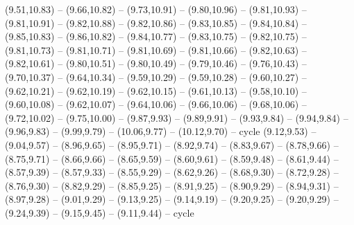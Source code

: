{(9.51,10.83) -- (9.66,10.82) -- (9.73,10.91) -- (9.80,10.96) -- (9.81,10.93) -- (9.81,10.91) -- (9.82,10.88) -- (9.82,10.86) -- (9.83,10.85) -- (9.84,10.84) -- (9.85,10.83) -- (9.86,10.82) -- (9.84,10.77) -- (9.83,10.75) -- (9.82,10.75) -- (9.81,10.73) -- (9.81,10.71) -- (9.81,10.69) -- (9.81,10.66) -- (9.82,10.63) -- (9.82,10.61) -- (9.80,10.51) -- (9.80,10.49) -- (9.79,10.46) -- (9.76,10.43) -- (9.70,10.37) -- (9.64,10.34) -- (9.59,10.29) -- (9.59,10.28) -- (9.60,10.27) -- (9.62,10.21) -- (9.62,10.19) -- (9.62,10.15) -- (9.61,10.13) -- (9.58,10.10) -- (9.60,10.08) -- (9.62,10.07) -- (9.64,10.06) -- (9.66,10.06) -- (9.68,10.06) -- (9.72,10.02) -- (9.75,10.00) -- (9.87,9.93) -- (9.89,9.91) -- (9.93,9.84) -- (9.94,9.84) -- (9.96,9.83) -- (9.99,9.79) -- (10.06,9.77) -- (10.12,9.70) -- cycle
  (9.12,9.53) -- (9.04,9.57) -- (8.96,9.65) -- (8.95,9.71) -- (8.92,9.74) -- (8.83,9.67) -- (8.78,9.66) -- (8.75,9.71) -- (8.66,9.66) -- (8.65,9.59) -- (8.60,9.61) -- (8.59,9.48) -- (8.61,9.44) -- (8.57,9.39) -- (8.57,9.33) -- (8.55,9.29) -- (8.62,9.26) -- (8.68,9.30) -- (8.72,9.28) -- (8.76,9.30) -- (8.82,9.29) -- (8.85,9.25) -- (8.91,9.25) -- (8.90,9.29) -- (8.94,9.31) -- (8.97,9.28) -- (9.01,9.29) -- (9.13,9.25) -- (9.14,9.19) -- (9.20,9.25) -- (9.20,9.29) -- (9.24,9.39) -- (9.15,9.45) -- (9.11,9.44) -- cycle}
